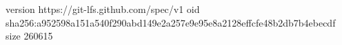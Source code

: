 version https://git-lfs.github.com/spec/v1
oid sha256:a952598a151a540f290abd149e2a257e9e95e8a2128effcfe48b2db7b4ebecdf
size 260615
